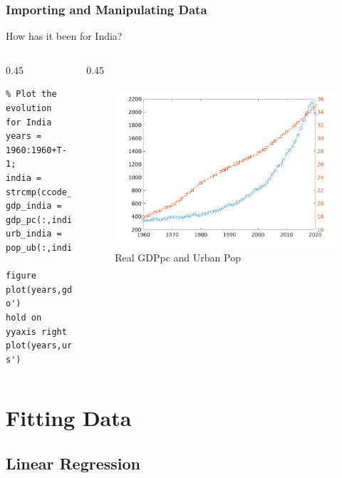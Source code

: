 \documentclass[11pt,xcolor={svgnames},aspectratio=169,usepdftitle=false,notheorems]{beamer}
\begin{document}
\begin{frame}[fragile]
  \frametitle{Importing and Manipulating Data}
How has it been for India?

\begin{columns}
\begin{column}{0.45\textwidth}
\begin{lstlisting}
% Plot the evolution for India
years = 1960:1960+T-1;
india = strcmp(ccode_gdp,'IND');
gdp_india = gdp_pc(:,india);
urb_india = pop_ub(:,india);
  
figure
plot(years,gdp_india,'-o')
hold on
yyaxis right
plot(years,urb_india,'-s')
\end{lstlisting}
\end{column}
\begin{column}{0.45\textwidth}
\begin{figure}
  \centering
  \includegraphics[width = \textwidth]{../figures/india_gdp_urb.png}
  \caption{Real GDPpc and Urban Pop}
  \label{fig:india_evolution}
\end{figure}
\end{column}
\end{columns}
\end{frame}

\section{Fitting Data}

\subsection{Linear Regression}
\end{document}

